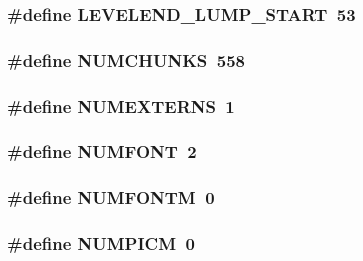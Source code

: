 \label{GFXE__WL1_8H_a01e5f4d5f8e05beb4315b9ad907e06e7}
\hypertarget{GFXE__WL1_8H_a1895eb960cb12bb7b49bf322e79d6c80}{
\subsubsection[{LEVELEND\_\-LUMP\_\-START}]{\setlength{\rightskip}{0pt plus 5cm}\#define LEVELEND\_\-LUMP\_\-START~53}}
\label{GFXE__WL1_8H_a1895eb960cb12bb7b49bf322e79d6c80}
\hypertarget{GFXE__WL1_8H_a06c8b188cc3cdd25a5451beeefddfa66}{
\subsubsection[{NUMCHUNKS}]{\setlength{\rightskip}{0pt plus 5cm}\#define NUMCHUNKS~558}}
\label{GFXE__WL1_8H_a06c8b188cc3cdd25a5451beeefddfa66}
\hypertarget{GFXE__WL1_8H_abb86554baf24d8863e54bf20d68120b5}{
\subsubsection[{NUMEXTERNS}]{\setlength{\rightskip}{0pt plus 5cm}\#define NUMEXTERNS~1}}
\label{GFXE__WL1_8H_abb86554baf24d8863e54bf20d68120b5}
\hypertarget{GFXE__WL1_8H_a7686ac8ed1dbf71ebee2b4711dae0edd}{
\subsubsection[{NUMFONT}]{\setlength{\rightskip}{0pt plus 5cm}\#define NUMFONT~2}}
\label{GFXE__WL1_8H_a7686ac8ed1dbf71ebee2b4711dae0edd}
\hypertarget{GFXE__WL1_8H_afd7a523b060f425fd737a94c044892ac}{
\subsubsection[{NUMFONTM}]{\setlength{\rightskip}{0pt plus 5cm}\#define NUMFONTM~0}}
\label{GFXE__WL1_8H_afd7a523b060f425fd737a94c044892ac}
\hypertarget{GFXE__WL1_8H_a2eb878497ab6b2a4f80015a218f38c8f}{
\subsubsection[{NUMPICM}]{\setlength{\rightskip}{0pt plus 5cm}\#define NUMPICM~0}}
